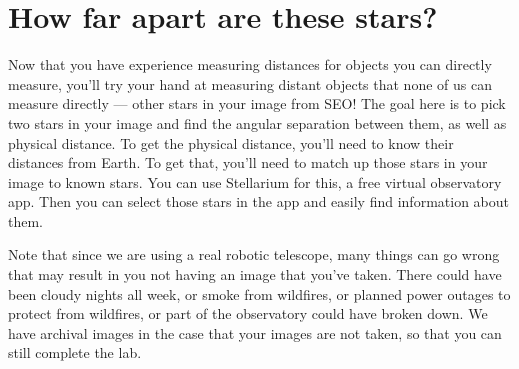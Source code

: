 \section{How far apart are these stars?}

Now that you have experience measuring distances for objects you can directly measure, you'll try your hand at measuring distant objects that none of us can measure directly --- other stars in your image from SEO! The goal here is to pick two stars in your image and find the angular separation between them, as well as physical distance. To get the physical distance, you'll need to know their distances from Earth. To get that, you'll need to match up those stars in your image to known stars. You can use Stellarium for this, a free virtual observatory app. Then you can select those stars in the app and easily find information about them.

Note that since we are using a real robotic telescope, many things can go wrong that may result in you not having an image that you've taken. There could have been cloudy nights all week, or smoke from wildfires, or planned power outages to protect from wildfires, or part of the observatory could have broken down. We have archival images in the case that your images are not taken, so that you can still complete the lab.

